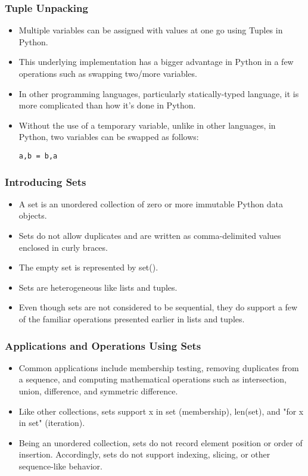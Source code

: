 \documentclass{beamer}
\begin{document}
\begin{frame}[fragile]
\frametitle{Tuple Unpacking}
\begin{itemize}
\item Multiple variables can be assigned with values at one go using Tuples in Python.
\item This underlying implementation has a bigger advantage in Python in a few  operations such as swapping two/more variables.
\item In other programming languages, particularly statically-typed language, it is more complicated than how it's done in Python.
\item Without the use of a temporary variable, unlike in other languages, in Python, two variables can be swapped as follows:
\begin{lstlisting}
a,b = b,a
\end{lstlisting}
\end{itemize}
\end{frame}

\begin{frame}
\frametitle{Introducing Sets}
\begin{itemize}
\item A set is an unordered collection of zero or more immutable Python data objects. 
\item Sets do not allow duplicates and are written as comma-delimited values enclosed in curly braces. 
\item The empty set is represented by set(). \item Sets are heterogeneous like lists and tuples.
\item Even though sets are not considered to be sequential, they do support a few of the familiar operations presented earlier in lists and tuples.
\end{itemize}
\end{frame}

\begin{frame}
\frametitle{Applications and Operations Using Sets}
\begin{itemize}
\item Common applications include membership testing, removing duplicates from a sequence, and computing mathematical operations such as intersection, union, difference, and symmetric difference.
\item Like other collections, sets support x in set (membership), len(set), and "for x in set" (iteration). 
\item Being an unordered collection, sets do not record element position or order of insertion. Accordingly, sets do not support indexing, slicing, or other sequence-like behavior.
\end{itemize}
\end{frame}
\end{document}
